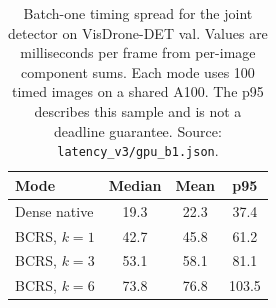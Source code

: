 \begin{table}[t]
\caption{Batch-one timing spread for the joint detector on VisDrone-DET val. Values are milliseconds per frame from per-image component sums. Each mode uses 100 timed images on a shared A100. The p95 describes this sample and is not a deadline guarantee. Source: \texttt{latency\_v3/gpu\_b1.json}.}
\label{tab:latency_spread}
\centering
\begin{tabular}{lccc}
\toprule
Mode & Median & Mean & p95 \\
\midrule
Dense native & 19.3 & 22.3 & 37.4 \\
BCRS, $k{=}1$ & 42.7 & 45.8 & 61.2 \\
BCRS, $k{=}3$ & 53.1 & 58.1 & 81.1 \\
BCRS, $k{=}6$ & 73.8 & 76.8 & 103.5 \\
\bottomrule
\end{tabular}
\end{table}

